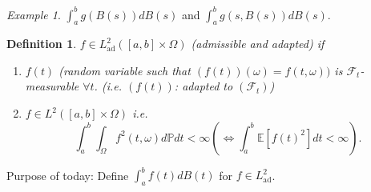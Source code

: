 \documentclass[12pt]{report}
\renewcommand{\P}{\mathbb{P}}
\newcommand{\F}{\mathcal{F}}
\newcommand{\E}{\mathbb{E}}
\renewcommand{\1}{\mathbb{1}}
\theoremstyle{break}
\theoremstyle{newdef}
\newtheorem{defn}[thm]{Definition} %
\theoremstyle{remark}
\newtheorem*{exmp}{Example} %
\begin{document}
\begin{exmp}
$\int_a^b g(B(s)) dB(s)$ and $\int_a^b g(s,B(s))dB(s)$.
\end{exmp}


\begin{defn}
$f \in L^2_{\text{ad}}([a,b]\times \Omega)$ (admissible and adapted) if
\begin{enumerate}
\item $f(t)$ (random variable such that $(f(t))(\omega) = f(t,\omega))$ is $\F_t$-measurable $\forall t$.
(i.e. $(f(t))$: adapted to $(\F_t)$)
\item $f \in L^2([a,b] \times \Omega)$ i.e.
$$
\int_a^b\int_\Omega f^2(t,\omega) d\P dt < \infty
(\Leftrightarrow \int_a^b \E[f(t)^2] dt < \infty).
$$
\end{enumerate}
\end{defn}


Purpose of today: Define $\int_a^b f(t) dB(t)$ for $f \in L^2_{\text{ad}}$.
\end{document}
